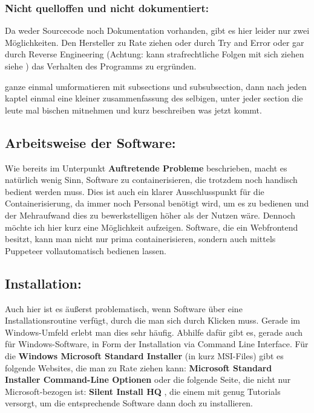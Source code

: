 \subsubsection{Nicht quelloffen und nicht dokumentiert:}
Da weder Sourcecode noch Dokumentation vorhanden, gibt es hier leider nur zwei Möglichkeiten.
Den Hersteller zu Rate ziehen oder durch Try and Error oder gar durch Reverse Engineering \cite{eilam2011reversing} (Achtung: kann strafrechtliche Folgen mit sich ziehen siehe \cite{Richtlinie}) das Verhalten des Programms zu ergründen.

ganze einmal umformatieren mit subsections und subsubsection, dann nach jeden kaptel einmal eine kleiner zusammenfassung des selbigen, unter jeder section die leute mal bischen mitnehmen und kurz beschreiben was jetzt kommt.

\subsection{Arbeitsweise der Software:}
Wie bereits im Unterpunkt \textbf{Auftretende Probleme} beschrieben, macht es natürlich wenig Sinn, Software zu containerisieren, die trotzdem noch handisch bedient werden muss.
Dies ist auch ein klarer Ausschlusspunkt für die Containerisierung, da immer noch Personal benötigt wird, um es zu bedienen und der Mehraufwand dies zu bewerkstelligen höher als der Nutzen wäre.
Dennoch möchte ich hier kurz eine Möglichkeit aufzeigen. Software, die ein Webfrontend besitzt, kann man nicht nur prima containerisieren, sondern auch mittels Puppeteer vollautomatisch bedienen lassen.

\subsection{Installation:}
Auch hier ist es äußerst problematisch, wenn Software über eine Installationsroutine verfügt, durch die man sich durch Klicken muss.
Gerade im Windows-Umfeld erlebt man dies sehr häufig. Abhilfe dafür gibt es, gerade auch für Windows-Software, in Form der Installation via Command Line Interface.
Für die \textbf{Windows Microsoft Standard Installer} (in kurz MSI-Files) gibt es folgende Websites, die man zu Rate ziehen kann: \textbf{Microsoft Standard Installer Command-Line Optionen} \cite{microsoft} oder die folgende Seite, die nicht nur Microsoft-bezogen ist: \textbf{Silent Install HQ} \cite{silent}, die einem mit genug Tutorials versorgt, um die entsprechende Software dann doch zu installieren.

